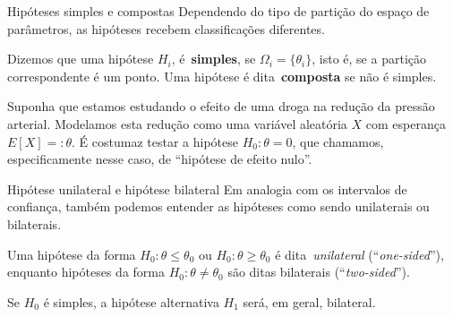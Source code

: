 \begin{frame}{Hipóteses simples e compostas}
 Dependendo do tipo de partição do espaço de parâmetros, as hipóteses recebem classificações diferentes.
 \begin{defn}
 \label{def:hypotheses_typesI}
  Dizemos que uma hipótese $H_i$, é~\textbf{simples}, se $\Omega_i = \{ \theta_i \}$, isto é, se a partição correspondente é um ponto. 
  Uma hipótese é dita~\textbf{composta} se não é simples.
 \end{defn}
 
 \begin{exemplo}
  Suponha que estamos estudando o efeito de uma droga na redução da pressão arterial.
  Modelamos esta redução como uma variável aleatória $X$ com esperança $E[X] =: \theta$.
  É costumaz testar a hipótese $H_0 : \theta = 0$, que chamamos, especificamente nesse caso, de ``hipótese de efeito nulo''.
 \end{exemplo}
\end{frame}

\begin{frame}{Hipótese unilateral e hipótese bilateral}
 Em analogia com os intervalos de confiança, também podemos entender as hipóteses como sendo unilaterais ou bilaterais.
 \begin{defn}
  \label{def:hypotheses_typesII}
  Uma hipótese da forma $H_0 : \theta \leq \theta_0$ ou $H_0 : \theta \geq \theta_0$ é dita~\textit{unilateral} (``\textit{one-sided}''), enquanto hipóteses da forma $H_0 : \theta \neq \theta_0$ são ditas bilaterais (``\textit{two-sided}'').
 \end{defn}
 
 \begin{obs}
 Se $H_0$ é simples, a hipótese alternativa $H_1$ será, em geral, bilateral.  
 \end{obs}
\end{frame}

